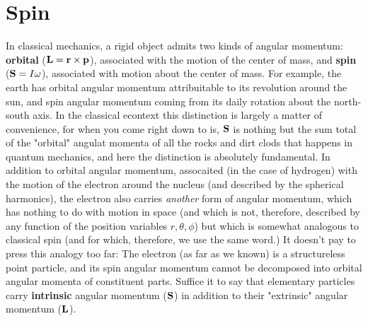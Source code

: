\section{Spin}
In classical mechanics, a rigid object admits two kinds of angular momentum: \textbf{orbital} ($\vb{L}=\vb{r}\times\vb{p}$), associated with the motion of the center of mass, and \textbf{spin} ($\vb{S}=I\omega$), associated with motion about the center of mass. For example, the earth has orbital angular momentum attribuitable to its revolution around the sun, and spin angular momentum coming from its daily rotation about the north-south axis. In the classical econtext this distinction is largely a matter of convenience, for when you come right down to is, $\vb{S}$ is nothing but the sum total of the "orbital" angulat momenta of all the rocks and dirt clods that happens in quantum mechanics, and here the distinction is absolutely fundamental. In addition to orbital angular momentum, assocaited (in the case of hydrogen) with the motion of the electron around the nucleus (and described by the spherical harmonics), the electron also carries \textit{another} form of angular momentum, which has nothing to do with motion in space (and which is not, therefore, described by any function of the position variables $r, \theta, \phi$) but which is somewhat analogous to classical spin (and for which, therefore, we use the same word.) It doesn't pay to press this analogy too far: The electron (as far as we known) is a structureless point particle, and its spin angular momentum cannot be decomposed into orbital angular momenta of constituent parts. Suffice it to say that elementary particles carry \textbf{intrinsic} angular momentum ($\vb{S}$) in addition to their "extrinsic" angular momentum ($\vb{L}$).

